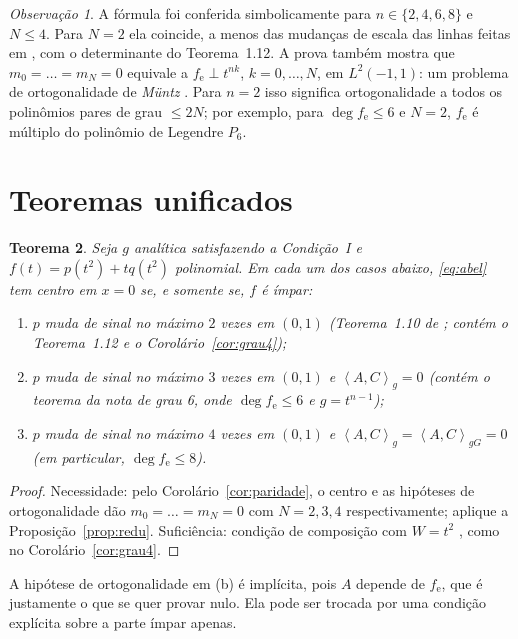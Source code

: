 \documentclass[11pt]{article}
\theoremstyle{plain}
\newtheorem{theorem}{Teorema}[section]
\theoremstyle{definition}
\theoremstyle{remark}
\newtheorem{remark}[theorem]{Observação}
\newcommand{\fe}{f_{\mathrm e}}
\newcommand{\ip}[2]{\left\langle #1,#2\right\rangle}
\begin{document}
\begin{remark}
A fórmula foi conferida simbolicamente para $n\in\{2,4,6,8\}$ e $N\le4$. Para
$N=2$ ela coincide, a menos das mudanças de escala das linhas feitas em
\cite[eq.~(21)]{ALA20}, com o determinante do Teorema~1.12. A prova também mostra
que $m_0=\dots=m_N=0$ equivale a $\fe\perp t^{nk}$, $k=0,\dots,N$, em
$L^2(-1,1)$: um problema de ortogonalidade de \emph{Müntz} \cite{BE95}. Para
$n=2$ isso significa ortogonalidade a todos os polinômios pares de grau $\le2N$;
por exemplo, para $\deg\fe\le6$ e $N=2$, $\fe$ é múltiplo do polinômio de
Legendre $P_6$.
\end{remark}

\section{Teoremas unificados}\label{sec:unificados}

\begin{theorem}\label{thm:A}
Seja $g$ analítica satisfazendo a Condição~I e $f(t)=p(t^2)+tq(t^2)$
polinomial. Em cada um dos casos abaixo, \eqref{eq:abel} tem centro em $x=0$ se,
e somente se, $f$ é ímpar:
\begin{enumerate}[label=(\alph*)]
\item $p$ muda de sinal no máximo $2$ vezes em $(0,1)$
 \emph{(Teorema~1.10 de \cite{ALA20}; contém o Teorema~1.12 e o
 Corolário~\ref{cor:grau4})};
\item $p$ muda de sinal no máximo $3$ vezes em $(0,1)$ e $\ip{A}{C}_g=0$
 \emph{(contém o teorema da nota de grau 6, onde $\deg\fe\le6$ e $g=t^{n-1}$)};
\item $p$ muda de sinal no máximo $4$ vezes em $(0,1)$ e
 $\ip{A}{C}_g=\ip{A}{C}_{gG}=0$ \emph{(em particular, $\deg\fe\le8$)}.
\end{enumerate}
\end{theorem}

\begin{proof}
Necessidade: pelo Corolário~\ref{cor:paridade}, o centro e as hipóteses de
ortogonalidade dão $m_0=\dots=m_N=0$ com $N=2,3,4$ respectivamente; aplique a
Proposição~\ref{prop:redu}. Suficiência: condição de composição com $W=t^2$
\cite{AL87}, como no Corolário~\ref{cor:grau4}.
\end{proof}

A hipótese de ortogonalidade em (b) é implícita, pois $A$ depende de $\fe$, que é
justamente o que se quer provar nulo. Ela pode ser trocada por uma condição
explícita sobre a parte ímpar apenas.
\end{document}

